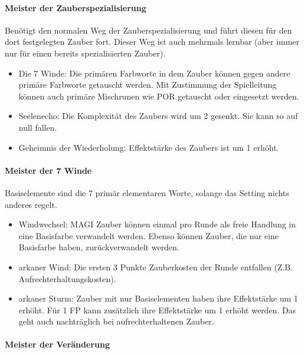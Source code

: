 \documentclass{article}
\begin{document}
\paragraph{Meister der Zauberspezialisierung}

Benötigt den normalen Weg der Zauberspezialisierung und führt diesen für den dort festgelegten Zauber fort. Dieser Weg
ist auch mehrmals lernbar (aber immer nur für einen bereits spezialisierten Zauber).

\begin{itemize}
\item Die 7 Winde: Die primären Farbworte in dem Zauber können gegen andere primäre Farbworte getauscht werden. Mit Zustimmung der Spielleitung können auch primäre Mischrunen wie POR getauscht oder eingesetzt werden.
\item Seelenecho: Die Komplexität des Zaubers wird um 2 gesenkt. Sie kann so auf null fallen.
\item Geheimnis der Wiederholung: Effektstärke des Zaubers ist um 1 erhöht.
\end{itemize}

\paragraph{Meister der 7 Winde}

Basiselemente sind die 7 primär elementaren Worte, solange das Setting nichts anderes regelt.

\begin{itemize}
\item Windwechsel: MAGI Zauber können einmal pro Runde als freie Handlung in eine Basisfarbe verwandelt werden. Ebenso können Zauber, die nur eine Basisfarbe haben, zurückverwandelt werden.
\item arkaner Wind: Die ersten 3 Punkte Zauberkosten der Runde entfallen (Z.B. Aufrechterhaltungskosten).
\item arkaner Sturm: Zauber mit nur Basiselementen haben ihre Effektstärke um 1 erhöht. Für 1 FP kann zusätzlich ihre Effektstärke um 1 erhöht werden. Das geht auch nachträglich bei aufrechterhaltenen Zauber.
\end{itemize}

\paragraph{Meister der Veränderung}
\end{document}
